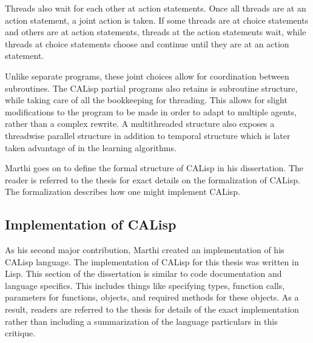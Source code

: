 \documentclass[jair,twoside,11pt,theapa]{article}
\begin{document}
Threads also wait for each other at action statements. Once all threads are at an action statement, a joint action is taken. If some threads are at choice statements and others are at action statements, threads at the action statements wait, while threads at choice statements choose and continue until they are at an action statement.  

Unlike separate programs, these joint choices allow for coordination between subroutines. The CALisp partial programs also retains is subroutine structure, while taking care of all the bookkeeping for threading. This allows for slight modifications to the program to be made in order to adapt to multiple agents, rather than a complex rewrite. A multithreaded structure also exposes a threadwise parallel structure in addition to temporal structure which is later taken advantage of in the learning algorithms. 

Marthi goes on to define the formal structure of CALisp in his dissertation. The reader is referred to the thesis for exact details on the formalization of CALisp. The formalization describes how one might implement CALisp. 



\subsection{Implementation of CALisp}
\label{Implementation}
As his second major contribution, Marthi created an implementation of his CALisp language. The implementation of CALisp for this thesis was written in Lisp.  This section of the dissertation is similar to code documentation and language specifics. This includes things like specifying types, function calls, parameters for functions, objects, and required methods for these objects. As a result, readers are referred to the thesis for details of the exact implementation rather than including a summarization of the language particulars in this critique. 
\end{document}

